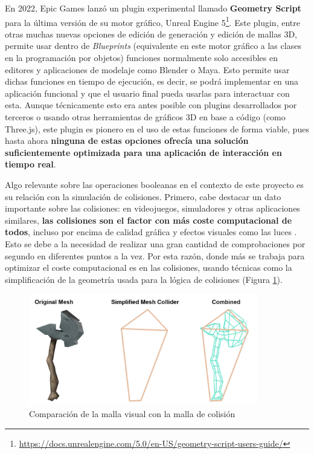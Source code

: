En 2022, Epic Games lanzó un plugin experimental llamado \textbf{Geometry Script} para la última versión de su motor gráfico, Unreal Engine 5\footnote{\url{https://docs.unrealengine.com/5.0/en-US/geometry-script-users-guide/}}. Este plugin, entre otras muchas nuevas opciones de edición de generación y edición de mallas 3D, permite usar dentro de \textit{Blueprints} (equivalente en este motor gráfico a las clases en la programación por objetos) funciones normalmente solo accesibles en editores y aplicaciones de modelaje como Blender o Maya. Esto permite usar dichas funciones en tiempo de ejecución, es decir, se podrá implementar en una aplicación funcional y que el usuario final pueda usarlas para interactuar con esta. Aunque técnicamente esto era antes posible con plugins desarrollados por terceros o usando otras herramientas de gráficos 3D en base a código (como Three.js), este plugin es pionero en el uso de estas funciones de forma viable, pues hasta ahora \textbf{ninguna de estas opciones ofrecía una solución suficientemente optimizada para una aplicación de interacción en tiempo real}.

Algo relevante sobre las operaciones booleanas en el contexto de este proyecto es su relación con la simulación de colisiones. Primero, cabe destacar un dato importante sobre las colisiones: en videojuegos, simuladores y otras aplicaciones similares, \textbf{las colisiones son el factor con más coste computacional de todos}, incluso por encima de calidad gráfica y efectos visuales como las luces \cite{collisions}. Esto se debe a la necesidad de realizar una gran cantidad de comprobaciones por segundo en diferentes puntos a la vez. Por esta razón, donde más se trabaja para optimizar el coste computacional es en las colisiones, usando técnicas como la simplificación de la geometría usada para la lógica de colisiones (Figura \ref{fig:colisiones}).

\begin{figure}[H]
	\centering
	\includegraphics[width=10cm]{imagenes/colisiones}
	\caption{Comparación de la malla visual con la malla de colisión}
	\label{fig:colisiones}
\end{figure}

